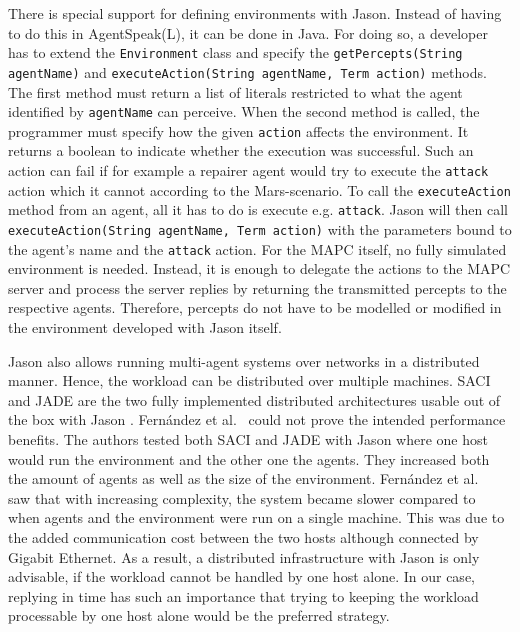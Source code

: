 There is special support for defining environments with Jason.
Instead of having to do this in AgentSpeak(L), it can be done in Java.
For doing so, a developer has to extend the \texttt{Environment} class and specify the \texttt{getPercepts(String agentName)} and \texttt{executeAction(String agentName, Term action)} methods.
The first method must return a list of literals restricted to what the agent identified by \texttt{agentName} can perceive.
When the second method is called, the programmer must specify how the given \texttt{action} affects the environment.
It returns a boolean to indicate whether the execution was successful.
Such an action can fail if for example a repairer agent would try to execute the \texttt{attack} action which it cannot according to the Mars-scenario.
To call the \texttt{executeAction} method from an agent, all it has to do is execute e.g. \texttt{attack}.
Jason will then call \texttt{executeAction(String agentName, Term action)} with the parameters bound to the agent's name and the \texttt{attack} action.
For the MAPC itself, no fully simulated environment is needed.
Instead, it is enough to delegate the actions to the MAPC server and process the server replies by returning the transmitted percepts to the respective agents.
Therefore, percepts do not have to be modelled or modified in the environment developed with Jason itself.

Jason also allows running multi-agent systems over networks in a distributed manner.
Hence, the workload can be distributed over multiple machines.
SACI~\cite{hubner_saci_2000} and JADE are the two fully implemented distributed architectures usable out of the box with Jason \cite{bordini_programming_2007}.
Fernández et al.~\cite{fernandez_evaluating_2010} could not prove the intended performance benefits.
The authors tested both SACI and JADE with Jason where one host would run the environment and the other one the agents.
They increased both the amount of agents as well as the size of the environment.
Fernández et al.~\cite{fernandez_evaluating_2010} saw that with increasing complexity, the system became slower compared to when agents and the environment were run on a single machine.
This was due to the added communication cost between the two hosts although connected by Gigabit Ethernet.
As a result, a distributed infrastructure with Jason is only advisable, if the workload cannot be handled by one host alone.
In our case, replying in time has such an importance that trying to keeping the workload processable by one host alone would be the preferred strategy.

